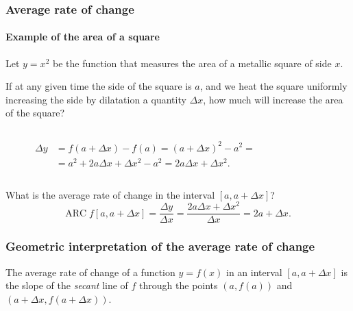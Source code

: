 \begin{frame}
\frametitle{Average rate of change}
\framesubtitle{Example of the area of a square}
Let $y=x^2$ be the function that measures the area of a metallic square of side $x$.

If at any given time the side of the square is $a$, and we heat the square uniformly increasing the side by dilatation a quantity $\Delta x$, how much will increase the area of the square?
\begin{columns}
\begin{column}{0.3\textwidth}
\begin{align*}
\Delta y &= f(a+\Delta x)-f(a)=(a+\Delta x)^2-a^2=\\
&= a^2+2a\Delta x+\Delta x^2-a^2=2a\Delta x+\Delta x^2.
\end{align*}
\end{column}
\begin{column}{0.3\textwidth}
\begin{center}
\end{center}
\end{column}
\end{columns}
What is the average rate of change in the interval $[a,a+\Delta x]$?
\[
\mbox{ARC}\;f[a,a+\Delta x]=\frac{\Delta y}{\Delta x}=\frac{2a\Delta x+\Delta x^2}{\Delta x}=2a+\Delta x.
\]
\end{frame}


\begin{frame}
\frametitle{Geometric interpretation of the average rate of change}
The average rate of change of a function $y=f(x)$ in an interval $[a,a+\Delta x]$ is the slope of the \emph{secant} line of $f$ through the points $(a,f(a))$ and $(a+\Delta x,f(a+\Delta x))$.
\begin{center}

\end{center}
\end{frame} 


